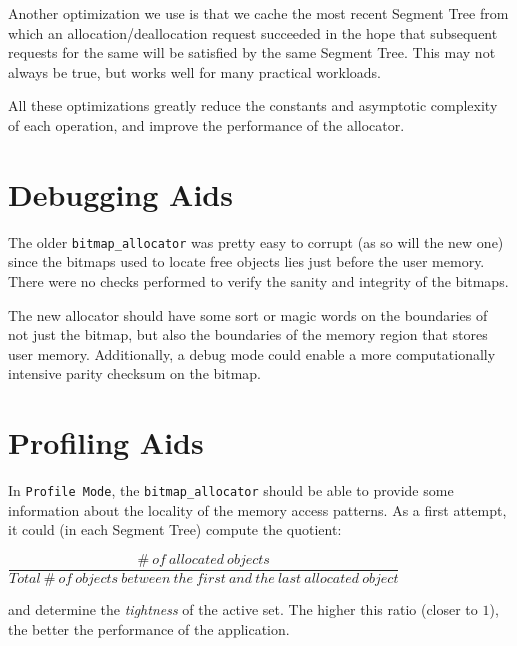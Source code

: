 \documentclass{article}
\begin{document}
Another optimization we use is that we cache the most recent Segment
Tree from which an allocation/deallocation request succeeded in the
hope that subsequent requests for the same will be satisfied by the
same Segment Tree. This may not always be true, but works well for
many practical workloads.

All these optimizations greatly reduce the constants and asymptotic
complexity of each operation, and improve the performance of the
allocator.


\section{Debugging Aids}

The older \texttt{bitmap\_allocator} was pretty easy to corrupt (as so
will the new one) since the bitmaps used to locate free objects lies
just before the user memory. There were no checks performed to verify
the sanity and integrity of the bitmaps.

The new allocator should have some sort or magic words on the
boundaries of not just the bitmap, but also the boundaries of the
memory region that stores user memory. Additionally, a debug mode
could enable a more computationally intensive parity checksum on the
bitmap.

\section{Profiling Aids}

In \texttt{Profile Mode}, the \texttt{bitmap\_allocator} should be
able to provide some information about the locality of the memory
access patterns. As a first attempt, it could (in each Segment Tree)
compute the quotient:

$\dfrac{\#\ of\ allocated\ objects}{Total\ \#\ of\ objects\ between\ the\ first\ and\ the\ last\ allocated\ object}$

and determine the \textit{tightness} of the active set. The higher
this ratio (closer to $1$), the better the performance of the
application.
\end{document}
